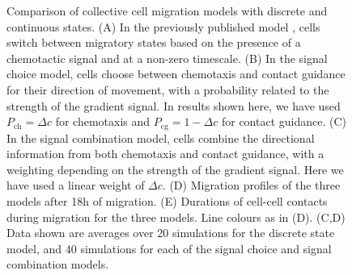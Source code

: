 \documentclass[review]{elsarticle}
\begin{document}
\begin{figure}
    \caption{Comparison of collective cell migration models with discrete and continuous states. (A) In the previously published model \cite{McLennan2015b}, cells switch between migratory states based on the presence of a chemotactic signal and at a non-zero timescale. (B) In the signal choice model, cells choose between chemotaxis and contact guidance for their direction of movement, with a probability related to the strength of the gradient signal. In results shown here, we have used $P_\mathrm{ch}=\Delta c$ for chemotaxis and $P_\mathrm{cg}=1 - \Delta c$ for contact guidance. (C) In the signal combination model, cells combine the directional information from both chemotaxis and contact guidance, with a weighting depending on the strength of the gradient signal. Here we have used a linear weight of $\Delta c$. (D) Migration profiles of the three models after 18h of migration. (E) Durations of cell-cell contacts during migration for the three models. Line colours as in (D). (C,D) Data shown are averages over 20 simulations for the discrete state model, and 40 simulations for each of the signal choice and signal combination models. \label{figNaiveModel}}
\end{figure}
\end{document}
